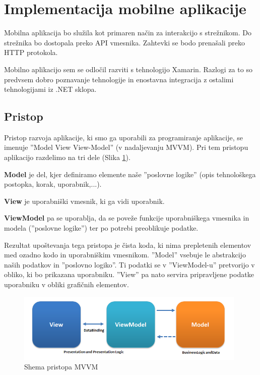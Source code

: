 \documentclass[a4paper, 12pt]{book}
\begin{document}
\section{Implementacija mobilne aplikacije}

Mobilna aplikacija bo služila kot primaren način za interakcijo s strežnikom.
Do strežnika bo dostopala preko API vmesnika.
Zahtevki se bodo prenašali preko HTTP protokola.

Mobilno aplikacijo sem se odločil razviti s tehnologijo Xamarin.
Razlogi za to so predvsem dobro poznavanje tehnologije in enostavna integracija z ostalimi tehnologijami iz .NET sklopa.


\subsection{Pristop}
Pristop razvoja aplikacije, ki smo ga uporabili za programiranje aplikacije, se imenuje ''Model View View-Model'' (v nadaljevanju MVVM).
Pri tem pristopu aplikacijo razdelimo na tri dele (Slika \ref{mvvm}).

\textbf{Model} je del, kjer definiramo elemente naše ''poslovne logike'' (opis tehnološkega postopka, korak, uporabnik,...).

\textbf{View} je uporabniški vmesnik, ki ga vidi uporabnik.

\textbf{ViewModel} pa se uporablja, da se poveže funkcije uporabniškega vmesnika in modela (''poslovne logike'') ter po potrebi preoblikuje podatke.

Rezultat upoštevanja tega pristopa je čista koda, ki nima prepletenih elementov med ozadno kodo in uporabniškim vmesnikom.
''Model'' vsebuje le abstrakcijo naših podatkov in ''poslovno logiko''.
Ti podatki se v ''ViewModel-u'' pretvorijo v obliko, ki bo prikazana uporabniku.
''View'' pa nato servira pripravljene podatke uporabniku v obliki grafičnih elementov.

\begin{figure}[H]
\begin{center}
\includegraphics[width=11cm]{mvvm}
\end{center}
	\caption{Shema pristopa MVVM}
\label{mvvm}
\end{figure}
\end{document}
